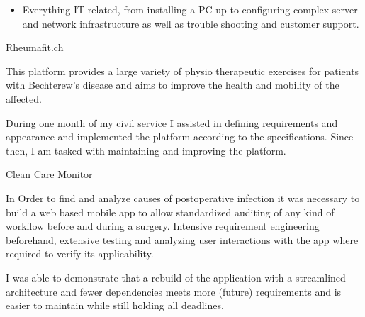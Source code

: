 \documentclass[9pt,a4paper]{altacv}
\begin{document}
\divider

\begin{itemize}
\item Everything IT related, from installing a PC up to configuring complex server and network infrastructure
as well as trouble shooting and customer support.
\end{itemize}



{\color{emphasis}Rheumafit.ch\par}
\smallskip
{\small{}}%
{\small{}}\par
\smallskip

This platform provides a large variety of physio therapeutic exercises for patients with Bechterew's disease
and aims to improve the health and mobility of the affected.

\smallskip

During one month of my civil service I assisted in defining requirements and appearance and
implemented the platform according to the specifications. Since then, I am tasked with maintaining
and improving the platform.


\divider


{\color{emphasis}Clean Care Monitor\par}
\smallskip
{\small{}}%
{\small{}}\par
\smallskip

In Order to find and analyze causes of postoperative infection it was necessary to
build a web based mobile app to allow standardized auditing of any kind of workflow
before and during a surgery. Intensive requirement engineering beforehand,
extensive testing and analyzing user interactions with the app where required
to verify its applicability.

\smallskip

I was able to demonstrate that a rebuild of the application with a streamlined architecture
and fewer dependencies meets more (future) requirements and is easier to maintain while still holding all deadlines.
\end{document}
